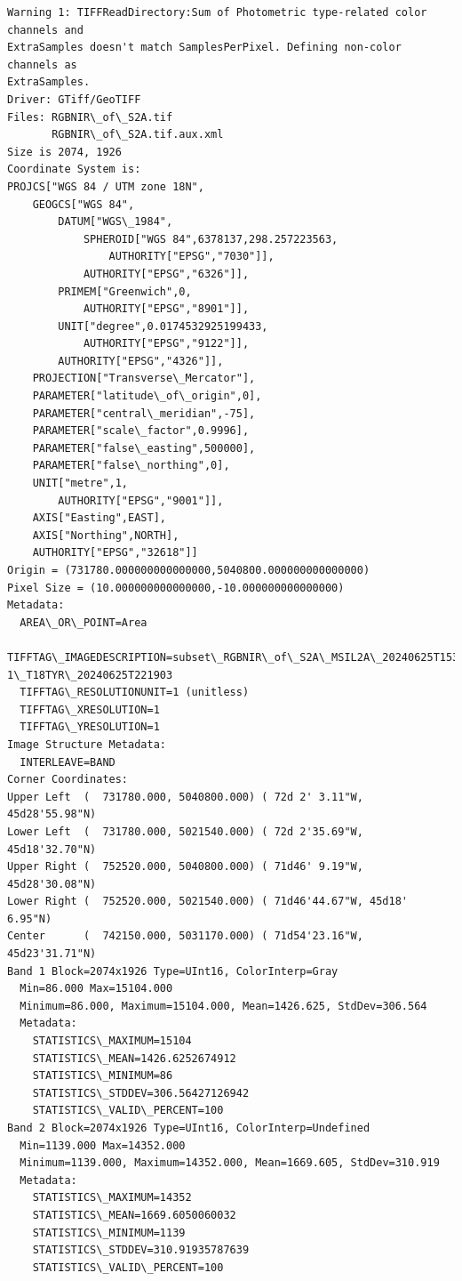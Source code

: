 \documentclass[11pt]{article}
\begin{document}
    \begin{Verbatim}[commandchars=\\\{\}]
Warning 1: TIFFReadDirectory:Sum of Photometric type-related color channels and
ExtraSamples doesn't match SamplesPerPixel. Defining non-color channels as
ExtraSamples.
Driver: GTiff/GeoTIFF
Files: RGBNIR\_of\_S2A.tif
       RGBNIR\_of\_S2A.tif.aux.xml
Size is 2074, 1926
Coordinate System is:
PROJCS["WGS 84 / UTM zone 18N",
    GEOGCS["WGS 84",
        DATUM["WGS\_1984",
            SPHEROID["WGS 84",6378137,298.257223563,
                AUTHORITY["EPSG","7030"]],
            AUTHORITY["EPSG","6326"]],
        PRIMEM["Greenwich",0,
            AUTHORITY["EPSG","8901"]],
        UNIT["degree",0.0174532925199433,
            AUTHORITY["EPSG","9122"]],
        AUTHORITY["EPSG","4326"]],
    PROJECTION["Transverse\_Mercator"],
    PARAMETER["latitude\_of\_origin",0],
    PARAMETER["central\_meridian",-75],
    PARAMETER["scale\_factor",0.9996],
    PARAMETER["false\_easting",500000],
    PARAMETER["false\_northing",0],
    UNIT["metre",1,
        AUTHORITY["EPSG","9001"]],
    AXIS["Easting",EAST],
    AXIS["Northing",NORTH],
    AUTHORITY["EPSG","32618"]]
Origin = (731780.000000000000000,5040800.000000000000000)
Pixel Size = (10.000000000000000,-10.000000000000000)
Metadata:
  AREA\_OR\_POINT=Area
  TIFFTAG\_IMAGEDESCRIPTION=subset\_RGBNIR\_of\_S2A\_MSIL2A\_20240625T153941\_N0510\_R01
1\_T18TYR\_20240625T221903
  TIFFTAG\_RESOLUTIONUNIT=1 (unitless)
  TIFFTAG\_XRESOLUTION=1
  TIFFTAG\_YRESOLUTION=1
Image Structure Metadata:
  INTERLEAVE=BAND
Corner Coordinates:
Upper Left  (  731780.000, 5040800.000) ( 72d 2' 3.11"W, 45d28'55.98"N)
Lower Left  (  731780.000, 5021540.000) ( 72d 2'35.69"W, 45d18'32.70"N)
Upper Right (  752520.000, 5040800.000) ( 71d46' 9.19"W, 45d28'30.08"N)
Lower Right (  752520.000, 5021540.000) ( 71d46'44.67"W, 45d18' 6.95"N)
Center      (  742150.000, 5031170.000) ( 71d54'23.16"W, 45d23'31.71"N)
Band 1 Block=2074x1926 Type=UInt16, ColorInterp=Gray
  Min=86.000 Max=15104.000
  Minimum=86.000, Maximum=15104.000, Mean=1426.625, StdDev=306.564
  Metadata:
    STATISTICS\_MAXIMUM=15104
    STATISTICS\_MEAN=1426.6252674912
    STATISTICS\_MINIMUM=86
    STATISTICS\_STDDEV=306.56427126942
    STATISTICS\_VALID\_PERCENT=100
Band 2 Block=2074x1926 Type=UInt16, ColorInterp=Undefined
  Min=1139.000 Max=14352.000
  Minimum=1139.000, Maximum=14352.000, Mean=1669.605, StdDev=310.919
  Metadata:
    STATISTICS\_MAXIMUM=14352
    STATISTICS\_MEAN=1669.6050060032
    STATISTICS\_MINIMUM=1139
    STATISTICS\_STDDEV=310.91935787639
    STATISTICS\_VALID\_PERCENT=100

\end{Verbatim}
\end{document}
